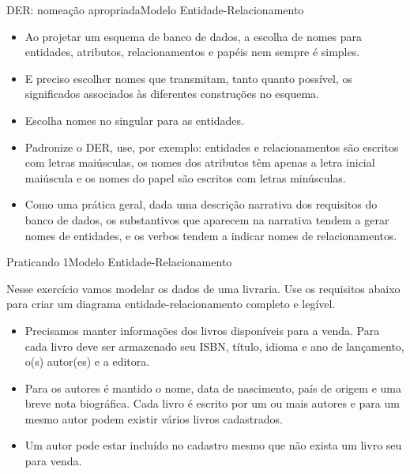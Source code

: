 \documentclass[t]{beamer}
\begin{document}

\begin{ftst}{DER: nomeação apropriada}{Modelo Entidade-Relacionamento}
\small
\begin{itemize}
    \item Ao projetar um esquema de banco de dados, a escolha de nomes para entidades, atributos, relacionamentos e papéis nem sempre é simples.
    \item E preciso escolher nomes que transmitam, tanto quanto possível, os significados associados às diferentes construções no esquema. 
    \item Escolha nomes no singular para as entidades.
    \item Padronize o DER, use, por exemplo: entidades e relacionamentos são escritos com letras maiúsculas, os nomes dos atributos têm apenas a letra inicial maiúscula e os nomes do papel são escritos com letras minúsculas.
    \item Como uma prática geral, dada uma descrição narrativa dos requisitos do banco de dados, os substantivos que aparecem na narrativa tendem a gerar nomes de entidades, e os verbos tendem a indicar nomes de relacionamentos. 
\end{itemize}
\end{ftst}


\begin{ftst}{Praticando 1}{Modelo Entidade-Relacionamento}

Nesse exercício vamos modelar os dados de uma livraria. Use os requisitos abaixo para criar um diagrama entidade-relacionamento completo e legível.
\vone
\begin{itemize}
    \item Precisamos manter informações dos livros disponíveis para a venda. Para cada livro deve ser armazenado seu ISBN, título, idioma e ano de lançamento, o(s) autor(es) e a editora.
    \item Para os autores é mantido o nome, data de nascimento, país de origem e uma breve nota biográfica.
    \ite Cada livro é escrito por um ou mais autores e para um mesmo autor podem existir vários livros cadastrados.
    \item Um autor pode estar incluído no cadastro mesmo que não exista um livro seu para venda.
    
\end{itemize}

\end{ftst}
\end{document}
